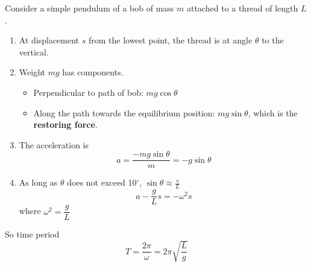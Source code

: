Consider a simple pendulum of a bob of mass $m$ attached to a thread of length $L$.
\begin{enumerate}
    \item At displacement $s$ from the lowest point, the thread is at angle $\theta$ to the vertical.
    \item Weight $mg$ has components.
        \begin{itemize}
            \item Perpendicular to path of bob: $mg\cos\theta$
            \item Along the path towards the equilibrium position: $mg\sin\theta$, which is the \textbf{restoring force}.
        \end{itemize}
    \item The acceleration is
        $$a=\frac{-mg\sin\theta}{m}=-g\sin\theta$$
    \item As long as $\theta$ does not exceed 10$^\circ$, $\sin\theta\approx\frac{s}{L}$
        $$a-\frac{g}{L}s=-\omega^2s$$
        where $\omega^2=\dfrac{g}{L}$
\end{enumerate}

So time period
$$T=\frac{2\pi}{\omega}=2\pi\sqrt{\frac{L}{g}}$$
